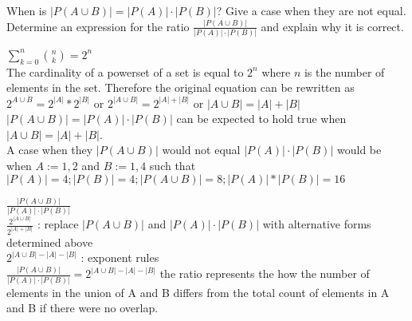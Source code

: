 \documentclass[solution,letterpaper]{cs20}
\begin{document}
    \begin{problem}
        When is $|P(A \cup B)| = |P(A)| \cdot |P(B)|$?
        Give a case when they are not equal.
        Determine an expression for the ratio $\frac{|P(A \cup B)|}{|P(A)| \cdot |P(B)|}$ and explain why it is correct.

        \begin{solution}
            $\sum_{k=0}^{n} {n \choose k} = 2^n$ \\
            The cardinality of a powerset of a set is equal to $2^n$ where $n$ is the number of elements in the set. Therefore the original equation can be rewritten as $2^{A \cup B} =  2^{| A |} * 2^{|B|}$ or $2^{|A \cup B|} = 2^{|A| + |B|}$ or $|A \cup B| = |A| + |B|$
            $|P(A \cup B)| = |P(A)| \cdot |P(B)|$ can be expected to hold true when $|A \cup B| = |A| + |B|$. \\

            A case when they $|P(A \cup B)|$ would not equal $|P(A)| \cdot |P(B)|$ would be when $A := {1, 2}$ and $B:= {1,4}$ such that $\vert P(A) \vert = 4; \vert P(B) \vert = 4; \vert P(A \cup B) \vert = 8; |P(A)|*|P(B)| = 16 $

            $\frac{|P(A \cup B)|}{|P(A)| \cdot |P(B)|}$ \\
            $\frac{2^{|A \cup B|}}{2^{|A| + |B|}}$ : replace $|P(A \cup B)|$ and $|P(A)| \cdot |P(B)|$ with alternative forms determined above \\
            $2^{|A \cup B| - |A| - |B|}$ : exponent rules \\

            $\frac{|P(A \cup B)|}{|P(A)| \cdot |P(B)|} = 2^{|A \cup B| - |A| - |B|}$ the ratio represents the how the number of elements in the union of  A and  B differs from the total count of elements in  A and  B if there were no overlap.
        \end{solution}
    \end{problem}
    \newpage
\end{document}
